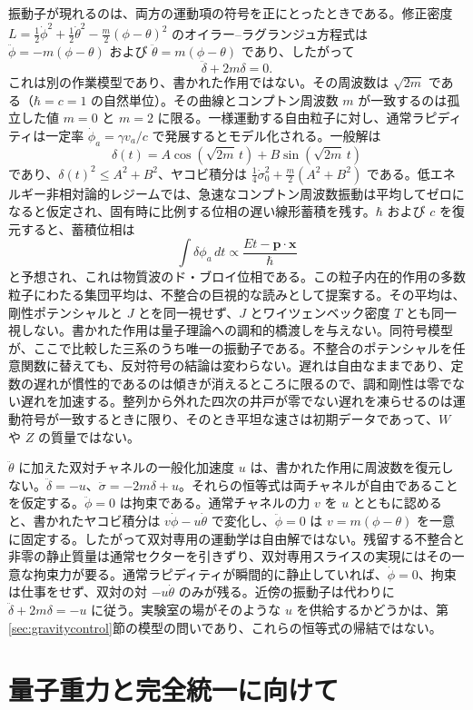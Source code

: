 \documentclass[a4paper]{article}
\begin{document}
振動子が現れるのは、両方の運動項の符号を正にとったときである。修正密度 $L=\tfrac12\dot\phi^2+\tfrac12\dot\theta^2-\tfrac m2(\phi-\theta)^2$ のオイラー--ラグランジュ方程式は $\ddot\phi=-m(\phi-\theta)$ および $\ddot\theta=m(\phi-\theta)$ であり、したがって
\[
\ddot\delta+2m\delta=0.
\]
これは別の作業模型であり、書かれた作用ではない。その周波数は $\sqrt{2m}$ である（$\hbar = c = 1$ の自然単位）。その曲線とコンプトン周波数 $m$ が一致するのは孤立した値 $m=0$ と $m=2$ に限る。一様運動する自由粒子に対し、通常ラピディティは一定率 $\dot{\phi}_a=\gamma v_a/c$ で発展するとモデル化される。一般解は
\[
\delta(t)=A\cos(\sqrt{2m}\,t)+B\sin(\sqrt{2m}\,t)
\]
であり、$\delta(t)^2\le A^2+B^2$、ヤコビ積分は $\tfrac14\dot\sigma_0^2+\tfrac m2(A^2+B^2)$ である。低エネルギー非相対論的レジームでは、急速なコンプトン周波数振動は平均してゼロになると仮定され、固有時に比例する位相の遅い線形蓄積を残す。$\hbar$ および $c$ を復元すると、蓄積位相は
\[
\int \delta\phi_a \, dt \propto \frac{E t - \mathbf{p} \cdot \mathbf{x}}{\hbar}
\]
と予想され、これは物質波のド・ブロイ位相である。この粒子内在的作用の多数粒子にわたる集団平均は、不整合の巨視的な読みとして提案する。その平均は、剛性ポテンシャルと $J$ とを同一視せず、$J$ とワイツェンベック密度 $T$ とも同一視しない。書かれた作用は量子理論への調和的橋渡しを与えない。同符号模型が、ここで比較した三系のうち唯一の振動子である。不整合のポテンシャルを任意関数に替えても、反対符号の結論は変わらない。遅れは自由なままであり、定数の遅れが慣性的であるのは傾きが消えるところに限るので、調和剛性は零でない遅れを加速する。整列から外れた四次の井戸が零でない遅れを凍らせるのは運動符号が一致するときに限り、そのとき平坦な速さは初期データであって、$W$ や $Z$ の質量ではない。

$\ddot\theta$ に加えた双対チャネルの一般化加速度 $u$ は、書かれた作用に周波数を復元しない。$\ddot\delta=-u$、$\ddot\sigma=-2m\delta+u$。それらの恒等式は両チャネルが自由であることを仮定する。$\ddot\phi=0$ は拘束である。通常チャネルの力 $v$ を $u$ とともに認めると、書かれたヤコビ積分は $v\dot\phi-u\dot\theta$ で変化し、$\ddot\phi=0$ は $v=m(\phi-\theta)$ を一意に固定する。したがって双対専用の運動学は自由解ではない。残留する不整合と非零の静止質量は通常セクターを引きずり、双対専用スライスの実現にはその一意な拘束力が要る。通常ラピディティが瞬間的に静止していれば、$\dot\phi=0$、拘束は仕事をせず、双対の対 $-u\dot\theta$ のみが残る。近傍の振動子は代わりに $\ddot\delta+2m\delta=-u$ に従う。実験室の場がそのような $u$ を供給するかどうかは、第\ref{sec:gravitycontrol}節の模型の問いであり、これらの恒等式の帰結ではない。

\section{量子重力と完全統一に向けて}
\label{sec:quantumgravity}
\end{document}
